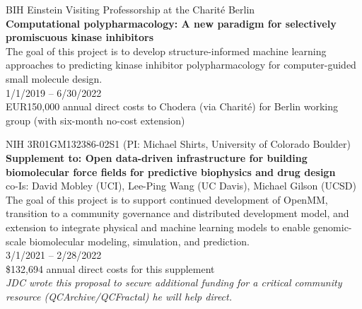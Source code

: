 \documentclass[10pt]{article}
\begin{document}

\vspace{1.5ex}

BIH Einstein Visiting Professorship at the Charit\'{e} Berlin\\
{\bf Computational polypharmacology: A new paradigm for selectively promiscuous kinase inhibitors}\\
The goal of this project is to develop structure-informed machine learning approaches to predicting kinase inhibitor polypharmacology for computer-guided small molecule design.\\
1/1/2019 -- 6/30/2022\\
EUR150,000 annual direct costs to Chodera (via Charit\'{e}) for Berlin working group (with six-month no-cost extension)

%

\vspace{1.5ex}

NIH 3R01GM132386-02S1 (PI: Michael Shirts, University of Colorado Boulder)\\
{\bf Supplement to: Open data-driven infrastructure for building biomolecular force fields for predictive biophysics and drug design}\\
co-Is: David Mobley (UCI), Lee-Ping Wang (UC Davis), Michael Gilson (UCSD) \\
The goal of this project is to support continued development of OpenMM, transition to a community governance and distributed development model, and extension to integrate physical and machine learning models to enable genomic-scale biomolecular modeling, simulation, and prediction.\\
3/1/2021 -- 2/28/2022\\
\$132,694 annual direct costs for this supplement\\
\emph{JDC wrote this proposal to secure additional funding for a critical community resource (QCArchive/QCFractal) he will help direct.}

\vspace{-0.1in} 
\end{document}

